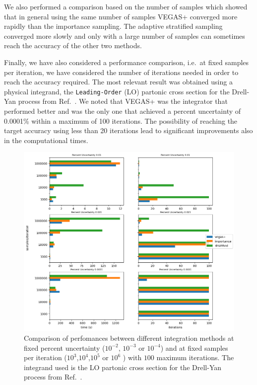 \documentclass[../main/main.tex]{subfiles}
\begin{document}
We also performed a comparison based on the number of samples which showed that in general using the same number of samples VEGAS+
converged more rapidly than the importance sampling. The adaptive stratified sampling converged more slowly and only with a large number of samples can sometimes reach the accuracy of the other two methods.

Finally, we have also considered a performance comparison, i.e.\ at fixed samples per iteration, we have considered the number of iterations needed in order to reach the accuracy required.
The most relevant result was obtained using a physical integrand, the \texttt{Leading-Order} (LO) partonic cross section for the Drell-Yan process from Ref.~\cite{Carrazza_2020}.
We noted that VEGAS+ was the integrator that performed better and was the only one that achieved a percent uncertainty of 0.0001\% within a maximum of 100 iterations.
The possibility of reaching the target accuracy using less than 20 iterations lead to significant improvements also in the computational times. 

\begin{figure}
	\centering
	\includegraphics[width=15cm]{../../../tests/performance_plots/dy_aa.png}
	\caption{Comparison of perfomances between different integration methods at fixed percent uncertainty ($10^{-2}$, $10^{-3}$ or $10^{-4}$) and at fixed samples per iteration ($10^3$,$10^4$,$10^5$ or $10^6$ ) with $100$ maximum iterations. The integrand used is the LO partonic cross section for the Drell-Yan process from Ref.~\cite{Carrazza_2020}.}
	\label{dy_aa}
\end{figure}
\end{document}
